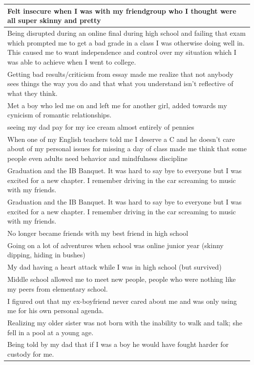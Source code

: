 \documentclass[
  .7em,
  letterpaper,
  DIV=11,
  numbers=noendperiod]{scrartcl}
\begin{document}
\begin{table}
\begin{tabular}{l}
\hline
Felt insecure when I was with my friendgroup who I thought were all super skinny and pretty\\
\hline
Being disrupted during an online final during high school and failing that exam which prompted me to get a bad grade in a class I was otherwise doing well in. This caused me to want independence and control over my situation which I was able to achieve when I went to college.\\
\hline
Getting bad results/criticism from essay made me realize that not anybody sees things the way you do and that what you understand isn't reflective of what they think.\\
\hline
Met a boy who led me on and left me for another girl, added towards my cynicism of romantic relationships.\\
\hline
seeing my dad pay for my ice cream almost entirely of pennies\\
\hline
When one of my English teachers told me I deserve a C and he doesn't care about of my personal issues for missing a day of class made me think that some people even adults need behavior and mindfulness discipline\\
\hline
Graduation and the IB Banquet. It was hard to say bye to everyone but I was excited for a new chapter. I remember driving in the car screaming to music with my friends.\\
\hline
Graduation and the IB Banquet. It was hard to say bye to everyone but I was excited for a new chapter. I remember driving in the car screaming to music with my friends.\\
\hline
No longer became friends with my best friend in high school\\
\hline
Going on a lot of adventures when school was online junior year (skinny dipping, hiding in bushes)\\
\hline
My dad having a heart attack while I was in high school (but survived)\\
\hline
Middle school allowed me to meet new people, people who were nothing like my peers from elementary school.\\
\hline
I figured out that my ex-boyfriend never cared about me and was only using me for his own personal agenda.\\
\hline
Realizing my older sister was not born with the inability to walk and talk; she fell in a pool at a young age.\\
\hline
Being told by my dad that if I was a boy he would have fought harder for custody for me.\\

\end{tabular}
\end{table}
\end{document}
